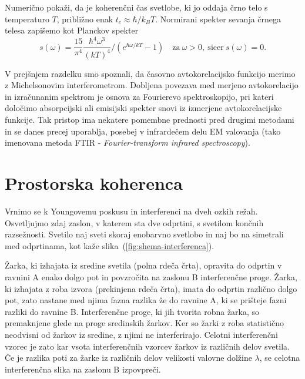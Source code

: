 \begin{definition}\label{naloga-Planck}
Numerično pokaži, da je koherenčni čas svetlobe, ki jo oddaja črno telo s 
temperaturo $T$, približno enak $t_{c}\approx{\hbar}/{k_{B}T}$.
Normirani spekter sevanja črnega telesa zapišemo 
kot Planckov spekter 
\begin{equation}
s(\omega)=\frac{15}{\pi^{4}} \frac{\hbar^4\omega^3}{(kT)^4}/\left(e^{\hbar\omega/kT}-1\right)
\quad \textrm{za}~\omega >0,~\textrm{sicer}~s(\omega) = 0.
\label{eq:Planckov-spekter}
\end{equation}
\end{definition}

\begin{remark}
V prejšnjem razdelku smo spoznali, da časovno avtokorelacijsko funkcijo
merimo z Michelsonovim interferometrom. Dobljena povezava med merjeno
avtokorelacijo in izračunanim spektrom je osnova za Fourierevo 
spektroskopijo,
pri kateri določimo absorpcijski ali emisijski spekter
snovi iz izmerjene avtokorelacijske funkcije. Tak pristop
ima nekatere pomembne prednosti pred drugimi metodami in se danes
precej uporablja, posebej v infrardečem delu EM valovanja (tako imenovana
metoda FTIR - {\it Fourier-transform infrared spectroscopy}).
\end{remark}

\section{Prostorska koherenca}
\label{Prostorska-koherenca}
Vrnimo se k Youngovemu poskusu in interferenci
 na dveh ozkih režah. Osvetljujmo zdaj zaslon, v katerem sta dve odprtini,
s svetilom končnih razsežnosti. Svetilo naj sveti skoraj enobarvno
svetlobo in naj bo na simetrali med odprtinama, kot kaže slika~(\ref{fig:shema-interferenca}).

Žarka, ki izhajata iz sredine svetila (polna rdeča črta), 
opravita do odprtin v ravnini A enako dolgo pot in povzročita na zaslonu B 
interferenčne proge. Žarka, ki izhajata z roba izvora (prekinjena rdeča črta), 
imata do odprtin različno dolgo pot, zato nastane med njima fazna razlika že do ravnine A, 
ki se prišteje fazni razliki do ravnine B. Interferenčne proge, ki jih tvorita 
robna žarka, so premaknjene glede na proge sredinskih žarkov. Ker so žarki z roba
statistično neodvisni od žarkov iz sredine, z njimi
ne interferirajo. Celotni interferenčni vzorec je zato kar vsota interferenčnih
vzorcev žarkov iz različnih delov svetila. Če je razlika poti za žarke
iz različnih delov velikosti valovne dolžine $\lambda$, se celotna
interferenčna slika na zaslonu B izpovpreči.

